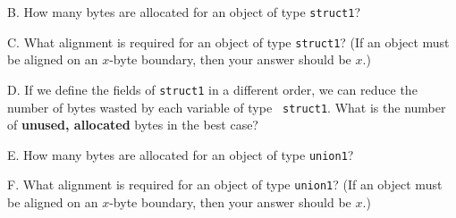 B. How many bytes are  allocated for an object of type {\tt struct1}?

C. What alignment is required for an object of type {\tt struct1}? 
(If an object must be aligned on an $x$-byte boundary, then your answer
should be $x$.)


D. If we define the fields of {\tt struct1} in a different order, we can
reduce the number of bytes wasted by each variable of type {\tt
struct1}.  What is the number of {\bf unused, allocated} bytes in the
best case?

E. How many bytes are  allocated for an object of type {\tt union1}?

F. What alignment is required for an object of type {\tt union1}?
(If an object must be aligned on an $x$-byte boundary, then your answer
should be $x$.)

